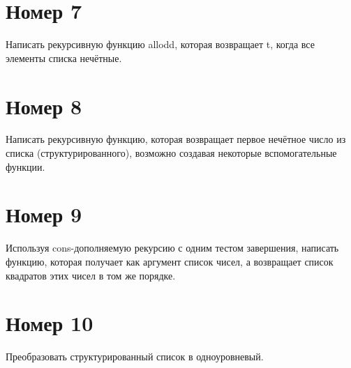 \begin{figure}[H]
    \begin{listingbox}{}
        
    \end{listingbox}
    \label{lst:6}
\end{figure}

\section{Номер 7}

Написать рекурсивную функцию allodd, которая возвращает t, когда все элементы
списка нечётные.

\begin{figure}[H]
    \begin{listingbox}{}
        
    \end{listingbox}
    \label{lst:7}
\end{figure}

\section{Номер 8}

Написать рекурсивную функцию, которая возвращает первое нечётное число из списка
(структурированного), возможно создавая некоторые вспомогательные функции.

\begin{figure}[H]
    \begin{listingbox}{}
        
    \end{listingbox}
    \label{lst:8}
\end{figure}

\section{Номер 9}

Используя cons-дополняемую рекурсию с одним тестом завершения, 
написать функцию, которая получает как аргумент список чисел, а возвращает
список квадратов этих чисел в том же порядке.

\begin{figure}[H]
    \begin{listingbox}{}
        
    \end{listingbox}
    \label{lst:9}
\end{figure}

\section{Номер 10}

Преобразовать структурированный список в одноуровневый.

\begin{figure}[H]
    \begin{listingbox}{}
        
    \end{listingbox}
    \label{lst:10}
\end{figure}